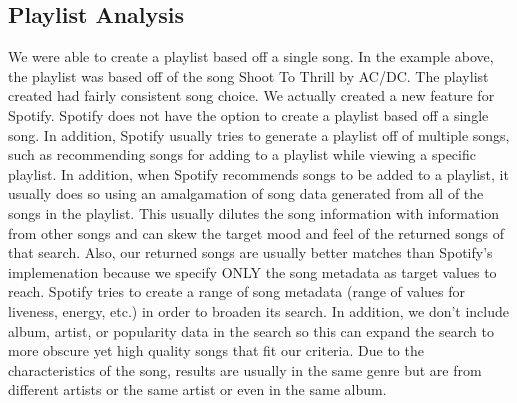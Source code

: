 \documentclass [letter,12pt] {article}
\begin{document}
\newpage
    \subsection{Playlist Analysis}
        We were able to create a playlist based off a single song. In the example above, the playlist was based off of the song Shoot To Thrill by AC/DC. The playlist created had fairly consistent song choice. We actually created a new feature for Spotify. Spotify does not have the option to create a playlist based off a single song. In addition, Spotify usually tries to generate a playlist off of multiple songs, such as recommending songs for adding to a playlist while viewing a specific playlist. In addition, when Spotify recommends songs to be added to a playlist, it usually does so using an amalgamation of song data generated from all of the songs in the playlist. This usually dilutes the song information with information from other songs and can skew the target mood and feel of the returned songs of that search. Also, our returned songs are usually better matches than Spotify's implemenation because we specify ONLY the song metadata as target values to reach. Spotify tries to create a range of song metadata (range of values for liveness, energy, etc.) in order to broaden its search. In addition, we don't include album, artist, or popularity data in the search so this can expand the search to more obscure yet high quality songs that fit our criteria. Due to the characteristics of the song, results are usually in the same genre but are from different artists or the same artist or even in the same album.

        
        
    

    

    
    
\end{document}
